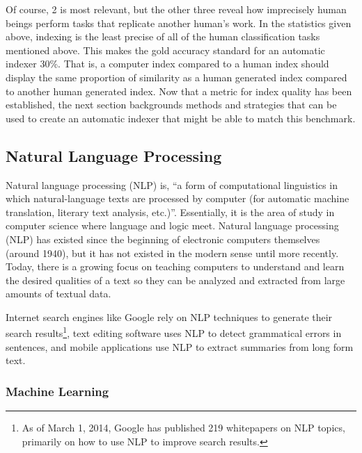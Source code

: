 Of course, 2 is most relevant, but the other three reveal how imprecisely human beings perform tasks that replicate another human's work.
In the statistics given above, indexing is the least precise of all of the human classification tasks mentioned above.
This makes the gold accuracy standard for an automatic indexer 30\%.
That is, a computer index compared to a human index should display the same proportion of similarity as a human generated index compared to another human generated index.
Now that a metric for index quality has been established, the next section backgrounds methods and strategies that can be used to create an automatic indexer that might be able to match this benchmark.

\subsection{Natural Language Processing}

Natural language processing (NLP) is, ``a form of computational linguistics in which natural-language texts are processed by computer (for automatic machine translation, literary text analysis, etc.)''\cite{oed-nlp}.
Essentially, it is the area of study in computer science where language and logic meet.
Natural language processing (NLP) has existed since the beginning of electronic computers themselves (around 1940), but it has not existed in the modern sense until more recently.
Today, there is a growing focus on teaching computers to understand and learn the desired qualities of a text so they can be analyzed and extracted from large amounts of textual data\cite{jurafsky}.

Internet search engines like Google rely on NLP techniques to generate their search results\footnote{As of March 1, 2014, Google has published 219 whitepapers on NLP topics, primarily on how to use NLP to improve search results.\cite{google-nlp}}, text editing software uses NLP to detect grammatical errors in sentences\cite{norvig}, and mobile applications use NLP to extract summaries from long form text\cite{bit-of-news}.

\subsubsection{Machine Learning}

